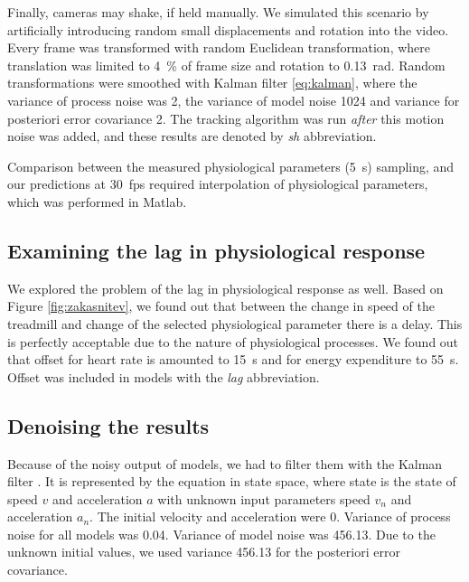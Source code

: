 Finally, cameras may shake, if held manually. We simulated this scenario by artificially introducing random small displacements and rotation into the video. Every frame was transformed with random Euclidean transformation, where translation was limited to \SI{4}{\%} of frame size and rotation to \SI{0.13}{rad}. Random transformations were smoothed with Kalman filter \eqref{eq:kalman}, where the variance of process noise was \num{2}, the variance of model noise \num{1024} and variance for posteriori error covariance \num{2}. The tracking algorithm was run \emph{after} this motion noise was added, and these results are denoted by \textit{sh} abbreviation.

Comparison between the measured physiological parameters (\SI{5}{\s}) sampling, and our predictions at \SI{30}{fps} required interpolation of physiological parameters, which was performed in Matlab.

\subsection{Examining the lag in physiological response}

We explored the problem of the lag in physiological response as well. Based on Figure \ref{fig:zakasnitev}, we found out that between the change in speed of the treadmill and change of the selected physiological parameter there is a delay. This is perfectly acceptable due to the nature of physiological processes. We found out that offset for heart rate is amounted to \SI{15}{\s} and for energy expenditure to \SI{55}{\s}. Offset was included in models with the \textit{lag} abbreviation.

\subsection{Denoising the results}

Because of the noisy output of models, we had to filter them with the Kalman filter \cite{forsyth2002computer}. It is represented by the equation  in state space, where state is the state of speed $v$ and acceleration $a$ with unknown input parameters speed $v_n$ and acceleration $a_n$. The initial velocity and acceleration were $0$. Variance of process noise for all models was \num{0.04}. Variance of model noise was \num{456.13}. Due to the unknown initial values, we used variance \num{456.13} for the posteriori error covariance.


